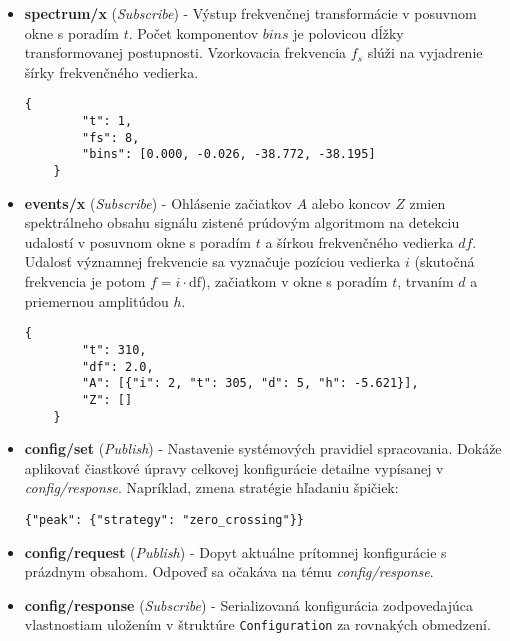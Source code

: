 \begin{itemize}[noitemsep,topsep=0pt]
\begin{lstlisting}[style=messages]
	}
	\end{lstlisting}
	\item \textbf{spectrum/x} (\emph{Subscribe}) - Výstup frekvenčnej transformácie v posuvnom okne s poradím $t$. Počet komponentov
	$bins$ je polovicou dĺžky transformovanej postupnosti. Vzorkovacia frekvencia $f_s$ slúži na vyjadrenie šírky frekvenčného
	vedierka.
	\begin{lstlisting}[style=messages]
	{
		"t": 1, 
		"fs": 8, 
		"bins": [0.000, -0.026, -38.772, -38.195]
	}
	\end{lstlisting}
	\item \textbf{events/x} (\emph{Subscribe}) - Ohlásenie začiatkov $A$ alebo koncov $Z$ zmien spektrálneho obsahu signálu 
	zistené prúdovým algoritmom na detekciu udalostí v posuvnom okne s poradím $t$ a šírkou frekvenčného vedierka $df$. 
	Udalosť významnej frekvencie sa vyznačuje pozíciou vedierka $i$ (skutočná frekvencia je potom $f = i \cdot \mathrm{df}$),
	začiatkom v okne s poradím $t$, trvaním $d$ a priemernou amplitúdou $h$.
	\begin{lstlisting}[style=messages]
	{
		"t": 310, 
		"df": 2.0,
		"A": [{"i": 2, "t": 305, "d": 5, "h": -5.621}],
		"Z": []
	}
	\end{lstlisting}
	\item \textbf{config/set}  (\emph{Publish}) - Nastavenie systémových pravidiel spracovania. Dokáže aplikovať čiastkové
	úpravy celkovej konfigurácie detailne vypísanej v \emph{config/response}. Napríklad, zmena stratégie hľadaniu špičiek:
	\begin{lstlisting}[style=messages]
	{"peak": {"strategy": "zero_crossing"}}
	\end{lstlisting}
	\item \textbf{config/request} (\emph{Publish}) - Dopyt aktuálne prítomnej konfigurácie s prázdnym obsahom.
	 Odpoveď sa očakáva na tému \emph{config/response}.
	\item \textbf{config/response} (\emph{Subscribe}) - Serializovaná konfigurácia zodpovedajúca vlastnostiam 
	uložením v štruktúre \verb|Configuration| za rovnakých obmedzení. 
	

\end{itemize}
